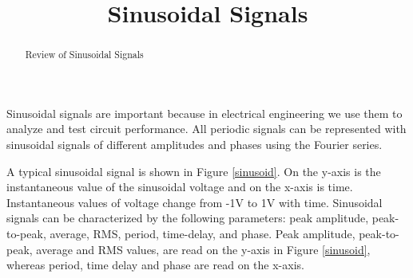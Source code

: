 \documentclass{ximera}
\title{Sinusoidal Signals}
\begin{document}
  
\begin{abstract}  
Review of Sinusoidal Signals
\end{abstract}  
\maketitle



Sinusoidal signals are important because in electrical engineering we use them to analyze and test circuit performance. All periodic signals can be represented with sinusoidal signals of different amplitudes and phases using the Fourier series. 

A typical sinusoidal signal is shown in Figure \ref{sinusoid}. On the y-axis is the instantaneous value of the sinusoidal voltage and on the x-axis is time. Instantaneous values of voltage change from -1V to 1V with time. Sinusoidal signals can be characterized by the following parameters: peak amplitude, peak-to-peak, average, RMS, period, time-delay, and phase. Peak amplitude, peak-to-peak, average and RMS values, are read on the y-axis in Figure \ref{sinusoid}, whereas period, time delay and phase are read on the x-axis.
\end{document}
